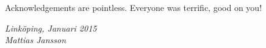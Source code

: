 \begin{acknowledgments}
  Acknowledgements are pointless. Everyone was terrific, good on you!

  \addvspace{1em}
  \begin{flushright}
    \textit{%
      Linköping, Januari 2015\\
      Mattias Jansson%
    }
  \end{flushright}
\end{acknowledgments}

